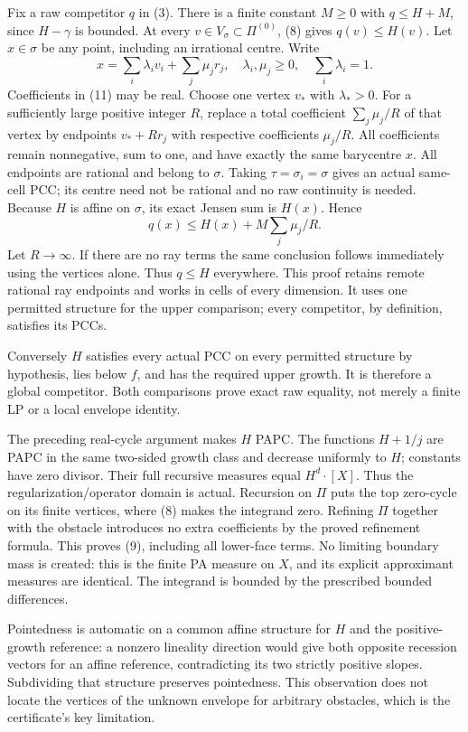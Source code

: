 \documentclass[
  10pt,
]{article}
\begin{document}
Fix a raw competitor \(q\) in (3). There is a finite constant \(M\geq0\)
with \(q\leq H+M\), since \(H-\gamma\) is bounded. At every
\(v\in V_\sigma\subset\Pi^{(0)}\), (8) gives \(q(v)\leq H(v)\). Let
\(x\in\sigma\) be any point, including an irrational centre. Write \[
 x=\sum_i\lambda_i v_i+\sum_j\mu_j r_j,
 \quad \lambda_i,\mu_j\geq0,\quad\sum_i\lambda_i=1.             \tag{11}
\] Coefficients in (11) may be real. Choose one vertex \(v_*\) with
\(\lambda_*>0\). For a sufficiently large positive integer \(R\),
replace a total coefficient \(\sum_j\mu_j/R\) of that vertex by
endpoints \(v_*+Rr_j\) with respective coefficients \(\mu_j/R\). All
coefficients remain nonnegative, sum to one, and have exactly the same
barycentre \(x\). All endpoints are rational and belong to \(\sigma\).
Taking \(\tau=\sigma_i=\sigma\) gives an actual same-cell PCC; its
centre need not be rational and no raw continuity is needed. Because
\(H\) is affine on \(\sigma\), its exact Jensen sum is \(H(x)\). Hence
\[
 q(x)\leq H(x)+M\sum_j\mu_j/R.
\] Let \(R\to\infty\). If there are no ray terms the same conclusion
follows immediately using the vertices alone. Thus \(q\leq H\)
everywhere. This proof retains remote rational ray endpoints and works
in cells of every dimension. It uses one permitted structure for the
upper comparison; every competitor, by definition, satisfies its PCCs.

Conversely \(H\) satisfies every actual PCC on every permitted structure
by hypothesis, lies below \(f\), and has the required upper growth. It
is therefore a global competitor. Both comparisons prove exact raw
equality, not merely a finite LP or a local envelope identity.

The preceding real-cycle argument makes \(H\) PAPC. The functions
\(H+1/j\) are PAPC in the same two-sided growth class and decrease
uniformly to \(H\); constants have zero divisor. Their full recursive
measures equal \(H^d\cdot[X]\). Thus the regularization/operator domain
is actual. Recursion on \(\Pi\) puts the top zero-cycle on its finite
vertices, where (8) makes the integrand zero. Refining \(\Pi\) together
with the obstacle introduces no extra coefficients by the proved
refinement formula. This proves (9), including all lower-face terms. No
limiting boundary mass is created: this is the finite PA measure on
\(X\), and its explicit approximant measures are identical. The
integrand is bounded by the prescribed bounded differences.

Pointedness is automatic on a common affine structure for \(H\) and the
positive-growth reference: a nonzero lineality direction would give both
opposite recession vectors for an affine reference, contradicting its
two strictly positive slopes. Subdividing that structure preserves
pointedness. This observation does not locate the vertices of the
unknown envelope for arbitrary obstacles, which is the certificate's key
limitation.
\end{document}
